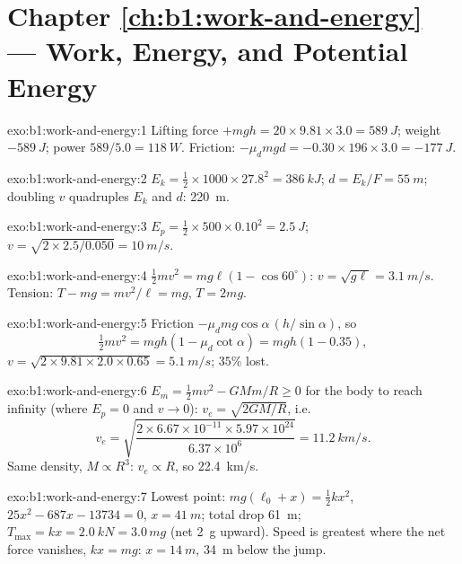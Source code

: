 \section*{Chapter \ref{ch:b1:work-and-energy} --- Work, Energy, and Potential Energy}

\begin{solution}{exo:b1:work-and-energy:1}
Lifting force $+mgh = 20 \times 9.81 \times 3.0 = \qty{589}{J}$; weight
$-\qty{589}{J}$; power $589/5.0 = \qty{118}{W}$. Friction: $-\mu_dmgd =
-0.30 \times 196 \times 3.0 = \qty{-177}{J}$.
\end{solution}

\begin{solution}{exo:b1:work-and-energy:2}
$E_k = \tfrac12 \times 1000 \times 27.8^2 = \qty{386}{kJ}$; $d = E_k/F =
\qty{55}{m}$; doubling $v$ quadruples $E_k$ and $d$: \qty{220}{m}.
\end{solution}

\begin{solution}{exo:b1:work-and-energy:3}
$E_p = \tfrac12 \times 500 \times 0.10^2 = \qty{2.5}{J}$; $v = \sqrt{2 \times
2.5/0.050} = \qty{10}{m/s}$.
\end{solution}

\begin{solution}{exo:b1:work-and-energy:4}
$\tfrac12 mv^2 = mg\ell(1 - \cos 60^\circ)$: $v = \sqrt{g\ell} = \qty{3.1}{m/s}$.
Tension: $T - mg = mv^2/\ell = mg$, $T = 2mg$.
\end{solution}

\begin{solution}{exo:b1:work-and-energy:5}
Friction  $-\mu_dmg\cos\alpha\,(h/\sin\alpha)$, so
\[
\tfrac12 mv^2 = mgh(1 - \mu_d\cot\alpha) = mgh(1 - 0.35),
\]
$v = \sqrt{2 \times 9.81 \times 2.0 \times 0.65} = \qty{5.1}{m/s}$; $35\%$ lost.
\end{solution}

\begin{solution}{exo:b1:work-and-energy:6}
$E_m = \tfrac12 mv^2 - GMm/R \geq 0$ for the body to reach infinity
(where $E_p = 0$ and $v \to 0$): $v_e = \sqrt{2GM/R}$, i.e.
\[
v_e = \sqrt{\frac{2 \times 6.67\times10^{-11} \times 5.97\times10^{24}}{6.37\times10^6}}
= \qty{11.2}{km/s}.
\]
Same density, $M \propto R^3$: $v_e \propto R$, so \qty{22.4}{km/s}.
\end{solution}

\begin{solution}{exo:b1:work-and-energy:7}
Lowest point: $mg(\ell_0 + x) = \tfrac12 kx^2$, $25x^2 - 687x - 13734 = 0$,
$x = \qty{41}{m}$; total drop \qty{61}{m}; $T_{\max} = kx = \qty{2.0}{kN}
= 3.0\,mg$ (net \qty{2}{g} upward). Speed is greatest where the net force
vanishes, $kx = mg$: $x = \qty{14}{m}$, \qty{34}{m} below the jump.
\end{solution}

